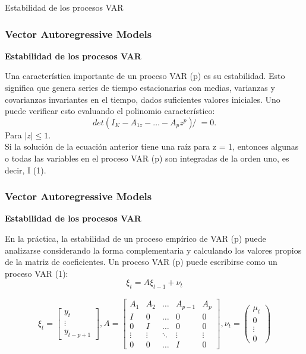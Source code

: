 \documentclass[spanish,xcolor=table]{beamer}
\begin{document}
\begin{section}{Estabilidad de los procesos VAR}
\begin{frame}
\frametitle{Vector Autoregressive Models}

\textbf{Estabilidad de los procesos VAR}

Una caracter\'{i}stica importante de un proceso VAR (p) es su estabilidad. Esto significa que genera series de tiempo estacionarias con medias, varianzas y covarianzas  invariantes en el tiempo, dados suficientes valores iniciales. Uno puede verificar esto evaluando el polinomio caracter\'{i}stico:
\begin{equation*}
det(I_K - A_{1z} - \dots{} - A_pz^p)̸=0.
\end{equation*}
Para $|z|\le1$.\\
Si la soluci\'on de la ecuaci\'on anterior tiene una ra\'{i}z para z = 1, entonces algunas o todas las variables en el proceso VAR (p) son integradas de la orden uno, es decir, I (1).

\end{frame}
\begin{frame}
\frametitle{Vector Autoregressive Models}

\textbf{Estabilidad de los procesos VAR}

En la pr\'actica, la estabilidad de un proceso emp\'{i}rico de VAR (p) puede analizarse considerando la forma complementaria y calculando los valores propios de la matriz de coeficientes. Un proceso VAR (p) puede escribirse como un proceso VAR (1):
\begin{equation*}
\xi_t=A\xi_{t-1}+\nu_t
\end{equation*}

\begin{gather*}
\xi_t=\begin{bmatrix} y_{t} \\ \vdots{} \\ y_{t-p+1} \end{bmatrix}
,
A=\begin{bmatrix} A_{1} & A_{2} & \dots{} & A_{p-1} & A_{p} \\
I & 0 & \dots{} & 0 & 0 \\
0 & I & \dots{} & 0 & 0 \\
\vdots{} & \vdots{} & \ddots{} & \vdots{} & \vdots{} \\
0 & 0 & \dots{} & I & 0 
\end{bmatrix}
,
\nu_t=\begin{pmatrix} \mu_{t} \\ 0 \\ \vdots{} \\ 0 \end{pmatrix}
\end{gather*}


\end{frame}
\end{section}
\end{document}

